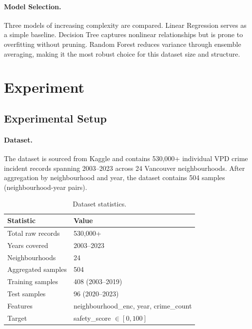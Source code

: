 \documentclass{article}
\begin{document}
\paragraph{Model Selection.}
Three models of increasing complexity are compared. Linear Regression serves as a
simple baseline. Decision Tree captures nonlinear relationships but is prone to
overfitting without pruning. Random Forest reduces variance through ensemble
averaging, making it the most robust choice for this dataset size and structure.

\section{Experiment}

\subsection{Experimental Setup}

\paragraph{Dataset.}
The dataset is sourced from Kaggle \cite{kaggle_vpd} and contains 530,000+
individual VPD crime incident records spanning 2003--2023 across 24 Vancouver
neighbourhoods. After aggregation by neighbourhood and year, the dataset contains
504 samples (neighbourhood-year pairs).

\begin{table}[H]
  \centering
  \caption{Dataset statistics.}
  \label{tab:dataset}
  \begin{tabular}{ll}
    \toprule
    \textbf{Statistic} & \textbf{Value} \\
    \midrule
    Total raw records    & 530,000+ \\
    Years covered        & 2003--2023 \\
    Neighbourhoods       & 24 \\
    Aggregated samples   & 504 \\
    Training samples     & 408 (2003--2019) \\
    Test samples         & 96 (2020--2023) \\
    Features             & neighbourhood\_enc, year, crime\_count \\
    Target               & safety\_score $\in [0, 100]$ \\
    \bottomrule
  \end{tabular}
\end{table}
\end{document}
